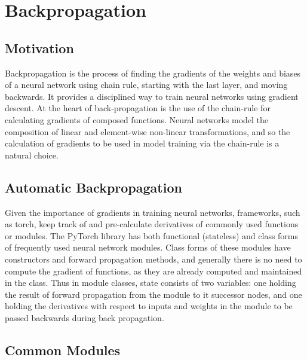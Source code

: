 \chapter{Backpropagation}\label{chp:Backpropagation}

\section{Motivation}

Backpropagation is the process of finding the gradients of the weights and biases of a neural network using chain rule, starting with the last layer, and moving backwards.
It provides a disciplined way to train neural networks using gradient descent.
At the heart of back-propagation is the use of the chain-rule for calculating gradients of composed functions.
Neural networks model the composition of linear and element-wise non-linear transformations, and so the calculation of gradients to be used in model training via the chain-rule is a natural choice.

\section{Automatic Backpropagation}

Given the importance of gradients in training neural networks, frameworks, such as torch, keep track of and pre-calculate derivatives of commonly used functions or modules.
The PyTorch library has both functional (stateless) and class forms of frequently used neural network modules.
Class forms of these modules have constructors and forward propagation methods, and generally there is no need to compute the gradient of functions, as they are already computed and maintained in the class.
Thus in module classes, state consists of two variables: one holding the result of forward propagation from the module to it successor nodes, and one holding the derivatives with respect to inputs and weights in the module to be passed backwards during back propagation.

\section{Common Modules}

